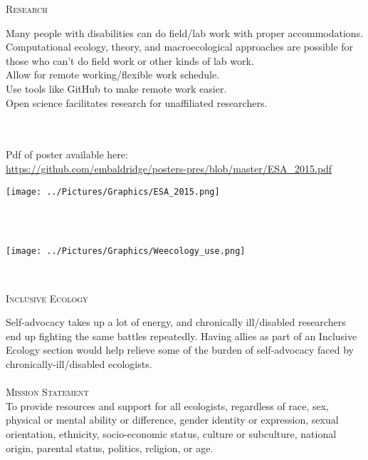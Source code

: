 \documentclass{beamer}
\begin{document}
\begin{center}
\begin{minipage}{0.42\linewidth}
\begin{Large}
\textsc{Research\\}
\end{Large}
Many people with disabilities can do field/lab work with proper accommodations.\\
Computational ecology, theory, and macroecological approaches are possible for those who can't do field work or other kinds of lab work.\\
Allow for remote working/flexible work schedule.\\
Use tools like GitHub to make remote work easier.\\
Open science facilitates research for unaffiliated researchers.\\
~\\
~\\
\begin{minipage}{0.60\linewidth}
Pdf of poster available here:\\
\url{https://github.com/embaldridge/posters-pres/blob/master/ESA_2015.pdf}\\
\end{minipage}
\hspace{2cm}
\begin{minipage}{0.3\linewidth}
\texttt{[image: ../Pictures/Graphics/ESA\_2015.png]} 
\end{minipage}
~\\
~\\
\begin{center}
\texttt{[image: ../Pictures/Graphics/Weecology\_use.png]}
\end{center}
\end{minipage}
\hspace{1cm}
\begin{minipage}{0.25\linewidth}
\vspace{0.5cm}
~\\
\begin{Large}
\textsc{Inclusive Ecology}\\
\end{Large}
Self-advocacy takes up a lot of energy, and chronically ill/disabled researchers end up fighting the same battles repeatedly.  Having allies as part of an Inclusive Ecology section would help relieve some of the burden of self-advocacy faced by chronically-ill/disabled ecologists.\\
~\\
\textsc{Mission Statement}\\
To provide resources and support for all ecologists, regardless of race, sex, physical or mental ability or difference, gender identity or expression, sexual orientation, ethnicity, socio-economic status, culture or subculture, national origin,  parental status, politics, religion, or age.\\

\end{minipage}
\end{center}
\end{document}
